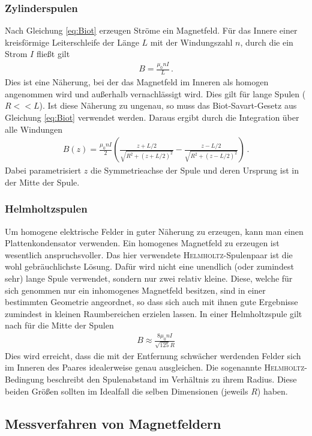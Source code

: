 \documentclass[12pt,a4paper,titlepage,headinclude,bibtotoc]{scrartcl}
\begin{document}
\subsubsection*{Zylinderspulen}
Nach Gleichung \ref{eq:Biot} erzeugen Ströme ein Magnetfeld.
Für das Innere einer kreisförmige Leiterschleife der Länge $L$ mit der Windungszahl $n$, durch die ein Strom $I$ fließt gilt
\begin{align}
	B=\frac{\mu_0 nI}L\,.
\end{align}
Dies ist eine Näherung, bei der das Magnetfeld im Inneren als homogen angenommen wird und außerhalb vernachlässigt wird.
Dies gilt für lange Spulen ($R<<L$).
Ist diese Näherung zu ungenau, so muss das Biot-Savart-Gesetz aus Gleichung \eqref{eq:Biot} verwendet werden.
Daraus ergibt durch die Integration über alle Windungen
\begin{align}
	B(z)=\frac{\mu_0 nI}{2}\left(\frac{z+L/2}{\sqrt{R^2+(z+L/2)^2}}-\frac{z-L/2}{\sqrt{R^2+(z-L/2)^2}}\right)\,.\label{eq:BSpule}
\end{align}
Dabei parametrisiert $z$ die Symmetrieachse der Spule und deren Ursprung ist in der Mitte der Spule.

\subsubsection*{Helmholtzspulen}
Um homogene elektrische Felder in guter Näherung zu erzeugen, kann man einen Plattenkondensator verwenden.
Ein homogenes Magnetfeld zu erzeugen ist wesentlich anspruchsvoller. 
Das hier verwendete \textsc{Helmholtz}-Spulenpaar ist die wohl gebräuchlichste Lösung.
Dafür wird nicht eine unendlich (oder zumindest sehr) lange Spule verwendet, sondern nur zwei relativ kleine.
Diese, welche für sich genommen nur ein inhomogenes Magnetfeld besitzen, sind in einer bestimmten Geometrie angeordnet, so dass sich auch mit ihnen gute Ergebnisse zumindest in kleinen Raumbereichen erzielen lassen.
In einer Helmholtzspule gilt nach \cite[S. 94]{demtroeder2} für die Mitte der Spulen
\begin{align}
	B\approx\frac{8\mu_0nI}{\sqrt{125}R}\label{eq:BHelm}
\end{align}
Dies wird erreicht, dass die mit der Entfernung schwächer werdenden Felder sich im Inneren des Paares idealerweise genau ausgleichen.
Die sogenannte \textsc{Helmholtz}-Bedingung beschreibt den Spulenabstand im Verhältnis zu ihrem Radius.
Diese beiden Größen sollten im Idealfall die selben Dimensionen (jeweils $R$) haben.
\subsection{Messverfahren von Magnetfeldern}
\end{document}
